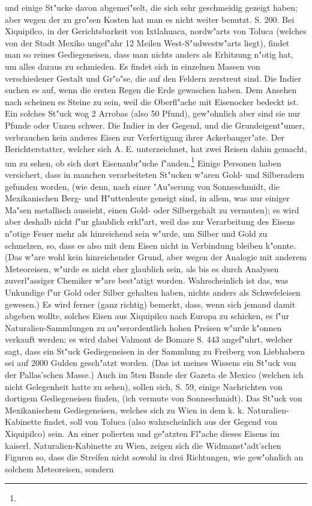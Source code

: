 \documentclass[a4paper, 11pt, oneside, polutonikogreek, german]{article}
\begin{document}
und einige St"ucke davon abgemei"selt, die sich sehr geschmeidig gezeigt haben; aber wegen der zu gro"sen Kosten hat man es nicht weiter benutzt. S. 200. Bei Xiquipilco, in der Gerichtsbarkeit von Ixtlahuaca, nordw"arts von Toluca (welches von der Stadt Mexiko ungef"ahr 12 Meilen West-S"udwestw"arts liegt), findet man so reines Gediegeneisen, dass man nichts anders als Erhitzung n"otig hat, um alles daraus zu schmieden. Es findet sich in einzelnen Massen von verschiedener Gestalt und Gr"o"se, die auf den Feldern zerstreut sind. Die Indier suchen es auf, wenn die ersten Regen die Erde gewaschen haben. Dem Ansehen nach scheinen es Steine zu sein, weil die Oberfl"ache mit Eisenocker bedeckt ist. Ein solches St"uck wog 2 Arrobas (also 50 Pfund), gew"ohnlich aber sind sie nur Pfunde oder Unzen schwer. Die Indier in der Gegend, und die Grundeigent"umer, verbrauchen kein anderes Eisen zur Verfertigung ihrer Ackerbauger"ate. Der Berichterstatter, welcher sich A. E. unterzeichnet, hat zwei Reisen dahin gemacht, um zu sehen, ob sich dort Eisenanbr"uche f"anden.\footnote{} Einige Personen haben versichert, dass in manchen verarbeiteten St"ucken w"aren Gold- und Silberadern gefunden worden, (wie denn, nach einer "Au"serung von Sonneschmidt, die Mexikanischen Berg- und H"uttenleute geneigt sind, in allem, was nur einiger Ma"sen metallisch aussieht, einen Gold- oder Silbergehalt zu vermuten); es wird aber deshalb nicht f"ur glaublich erkl"art, weil das zur Verarbeitung des Eisens n"otige Feuer mehr als hinreichend sein w"urde, um Silber und Gold zu schmelzen, so, dass es also mit dem Eisen nicht in Verbindung bleiben k"onnte. (Das w"are wohl kein hinreichender Grund, aber wegen der Analogie mit anderem Meteoreisen, w"urde es nicht eher glaublich sein, als bis es durch Analysen zuverl"assiger Chemiker w"are best"atigt worden. Wahrscheinlich ist das, was Unkundige f"ur Gold oder Silber gehalten haben, nichts anders als Schwefeleisen gewesen.) Es wird ferner (ganz richtig) bemerkt, dass, wenn sich jemand damit abgeben wollte, solches Eisen aus Xiquipilco nach Europa zu schicken, es f"ur Naturalien-Sammlungen zu au"serordentlich hohen Preisen w"urde k"onnen verkauft werden; es wird dabei Valmont de Bomare S. 443 angef"uhrt, welcher sagt, dass ein St"uck Gediegeneisen in der Sammlung zu Freiberg von Liebhabern sei auf 2000 Gulden gesch"atzt worden. (Das ist meines Wissens ein St"uck von der Pallas'schen Masse.) Auch im 5ten Bande der Gazeta de Mexico (welchen ich nicht Gelegenheit hatte zu sehen), sollen sich, S. 59, einige Nachrichten von dortigem Gediegeneisen finden, (ich vermute von Sonneschmidt). Das St"uck von Mexikanischem Gediegeneisen, welches sich zu Wien in dem k. k. Naturalien-Kabinette findet, soll von Toluca (also wahrscheinlich aus der Gegend von Xiquipilco) sein. An einer polierten und ge"atzten Fl"ache dieses Eisens im kaiserl. Naturalien-Kabinette zu Wien, zeigen sich die Widmanst"adt'schen Figuren so, dass die Streifen nicht sowohl in drei Richtungen, wie gew"ohnlich an solchem Meteoreisen, sondern 
\end{document}

